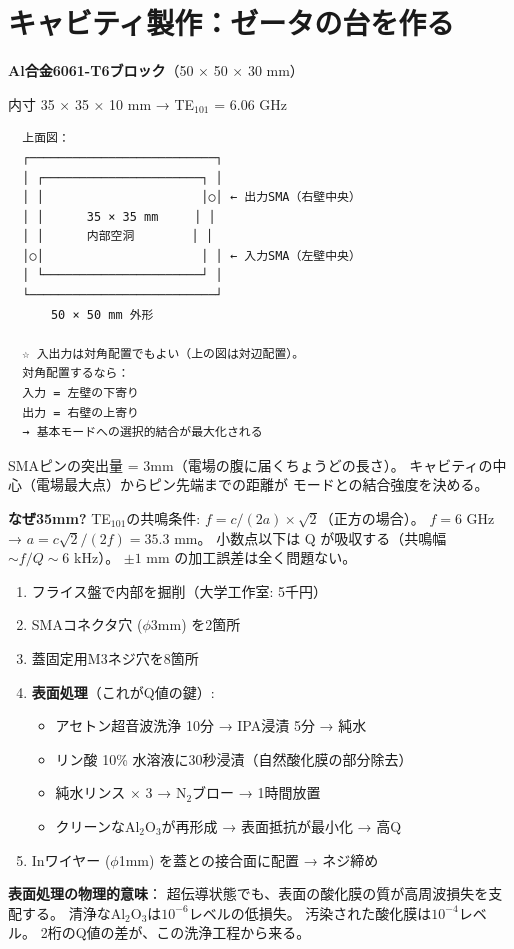 \documentclass[12pt,a4paper]{article}
\begin{document}
\section{キャビティ製作：ゼータの台を作る}

\begin{practicebox}[材料と設計]
\textbf{Al合金6061-T6ブロック}（50 × 50 × 30 mm）

内寸 35 × 35 × 10 mm → TE$_{101}$ = 6.06 GHz

\begin{verbatim}
  上面図：
  ┌──────────────────────────┐
  │ ┌──────────────────────┐ │
  │ │                      │○│ ← 出力SMA（右壁中央）
  │ │      35 × 35 mm     │ │
  │ │      内部空洞        │ │
  │○│                      │ │ ← 入力SMA（左壁中央）
  │ └──────────────────────┘ │
  └──────────────────────────┘
      50 × 50 mm 外形

  ☆ 入出力は対角配置でもよい（上の図は対辺配置）。
  対角配置するなら：
  入力 = 左壁の下寄り
  出力 = 右壁の上寄り
  → 基本モードへの選択的結合が最大化される
\end{verbatim}

SMAピンの突出量 = 3mm（電場の腹に届くちょうどの長さ）。
キャビティの中心（電場最大点）からピン先端までの距離が
モードとの結合強度を決める。

\textbf{なぜ35mm?}
TE$_{101}$の共鳴条件: $f = c/(2a) \times \sqrt{2}$（正方の場合）。
$f = 6$ GHz → $a = c\sqrt{2}/(2f) = 35.3$ mm。
小数点以下は Q が吸収する（共鳴幅 $\sim f/Q \sim 6$ kHz）。
$\pm 1$ mm の加工誤差は全く問題ない。
\end{practicebox}

\begin{practicebox}[加工と表面処理]
\begin{enumerate}
\item フライス盤で内部を掘削（大学工作室: 5千円）
\item SMAコネクタ穴 ($\phi$3mm) を2箇所
\item 蓋固定用M3ネジ穴を8箇所
\item \textbf{表面処理}（これがQ値の鍵）:
  \begin{itemize}
  \item アセトン超音波洗浄 10分 → IPA浸漬 5分 → 純水
  \item リン酸 10\% 水溶液に30秒浸漬（自然酸化膜の部分除去）
  \item 純水リンス $\times$ 3 → N$_2$ブロー → 1時間放置
  \item クリーンなAl$_2$O$_3$が再形成 → 表面抵抗が最小化 → 高Q
  \end{itemize}
\item Inワイヤー ($\phi$1mm) を蓋との接合面に配置 → ネジ締め
\end{enumerate}

\textbf{表面処理の物理的意味}：
超伝導状態でも、表面の酸化膜の質が高周波損失を支配する。
清浄なAl$_2$O$_3$は$10^{-6}$レベルの低損失。
汚染された酸化膜は$10^{-4}$レベル。
2桁のQ値の差が、この洗浄工程から来る。
\end{practicebox}
\end{document}
